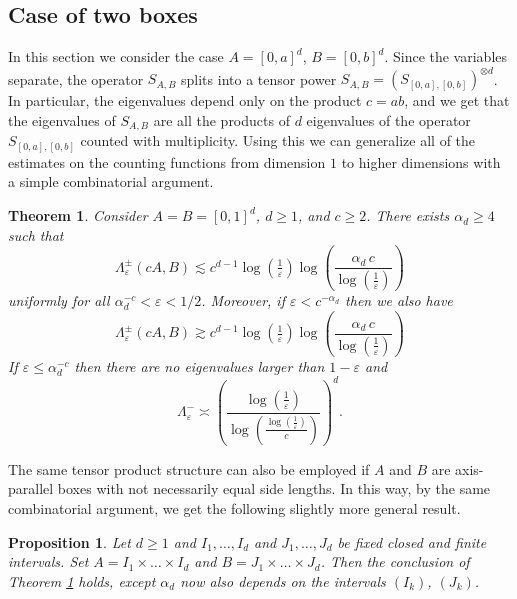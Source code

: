 \documentclass[12pt]{amsart}
\numberwithin{equation}{section}
\newcommand{\eps}{\varepsilon}
\newtheorem{theorem}[Thm]{Theorem}
\newtheorem{proposition}[Thm]{Proposition}
\begin{document}
\subsection{Case of two boxes}

In this section we consider the case $A = [0, a]^d$, $B = [0,b]^d$. Since the variables separate, the operator $S_{A,B}$ splits into a tensor power $S_{A,B} = \left(S_{[0,a],[0,b]}\right)^{\otimes d}$. In particular, the eigenvalues depend only on the product $c = ab$, and we get that the eigenvalues of $S_{A,B}$ are all the products of $d$ eigenvalues of the operator $S_{[0,a],[0,b]}$ counted with multiplicity. Using this we can generalize all of the estimates on the counting functions from dimension $1$ to higher dimensions with a simple combinatorial argument.

\begin{theorem}\label{two cubes}
Consider $A = B = [0, 1]^d$, $d\geq 1$, and $c\geq 2$. There exists $\alpha_d \geq 4$ such that
\begin{equation}\label{Lambda pm, upper, two cubes}
\Lambda_\eps^{\pm}(c A, B) \lesssim c^{d-1} \log(\tfrac{1}{\eps}) \log\left(\frac{\alpha_d \, c}{\log\left(\tfrac{1}{\eps}\right)}\right)
\end{equation}
uniformly for all $\alpha_d^{-c}< \eps < 1/2$. Moreover, if $\eps < c^{-\alpha_d}$ then we also have
\begin{equation}\label{Lambda pm, lower, two cubes}
\Lambda_\eps^{\pm}(c A, B) \gtrsim c^{d-1} \log(\tfrac{1}{\eps}) \log\left(\frac{\alpha_d \, c}{\log\left(\tfrac{1}{\eps}\right)}\right)
\end{equation}
If $\eps \leq \alpha_d^{-c}$ then there are no eigenvalues larger than $1-\eps$ and 
\begin{equation}\label{Lambda -, equivalence, two cubes}
\Lambda_\eps^- \asymp \left( \frac{\log(\tfrac{1}{\eps})}{\log \left(\tfrac{\log\left(\frac{1}{\eps}\right)}{c}\right)}\right)^d.
\end{equation}
\end{theorem}
The same tensor product structure can also be employed if $A$ and $B$ are axis-parallel boxes with not necessarily equal side lengths. In this way, by the same combinatorial argument, we get the following slightly more general result.
\begin{proposition}\label{two boxes}
Let $d\geq 1$ and $I_1,\dots, I_d$ and $J_1, \dots, J_d$ be fixed closed and finite intervals. Set $A = I_1 \times \dots \times I_d$ and $B = J_1 \times \dots \times J_d$. Then the conclusion of Theorem \ref{two cubes} holds, except $\alpha_d$ now also depends on the intervals $(I_k)$, $(J_k)$.
\end{proposition}
\end{document}

